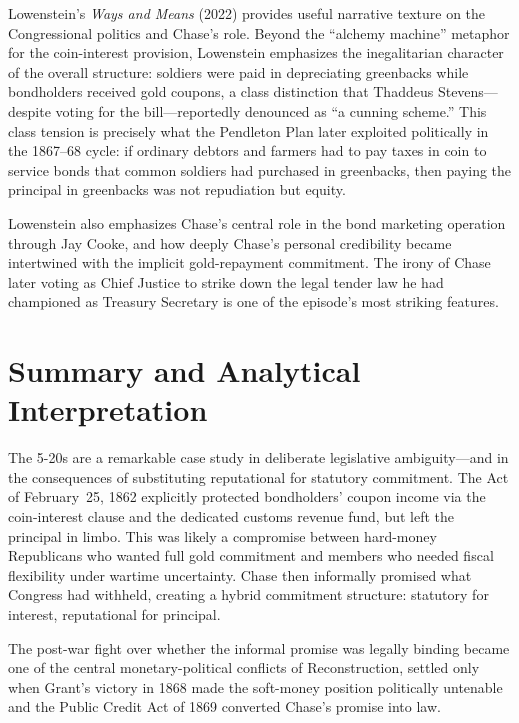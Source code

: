 \documentclass[12pt]{article}
\begin{document}
Lowenstein's \textit{Ways and Means} (2022) provides useful narrative
texture on the Congressional politics and Chase's role. Beyond the
``alchemy machine'' metaphor for the coin-interest provision, Lowenstein
emphasizes the inegalitarian character of the overall structure: soldiers
were paid in depreciating greenbacks while bondholders received gold
coupons, a class distinction that Thaddeus Stevens---despite voting for
the bill---reportedly denounced as ``a cunning scheme.'' This class
tension is precisely what the Pendleton Plan later exploited politically
in the 1867--68 cycle: if ordinary debtors and farmers had to pay taxes
in coin to service bonds that common soldiers had purchased in greenbacks,
then paying the principal in greenbacks was not repudiation but equity.

Lowenstein also emphasizes Chase's central role in the bond marketing
operation through Jay Cooke, and how deeply Chase's personal credibility
became intertwined with the implicit gold-repayment commitment. The
irony of Chase later voting as Chief Justice to strike down the legal
tender law he had championed as Treasury Secretary is one of the
episode's most striking features.

\section{Summary and Analytical Interpretation}

The 5-20s are a remarkable case study in deliberate legislative
ambiguity---and in the consequences of substituting reputational for
statutory commitment. The Act of February~25, 1862 explicitly protected
bondholders' coupon income via the coin-interest clause and the dedicated
customs revenue fund, but left the principal in limbo. This was likely a
compromise between hard-money Republicans who wanted full gold commitment
and members who needed fiscal flexibility under wartime uncertainty.
Chase then informally promised what Congress had withheld, creating a
hybrid commitment structure: statutory for interest, reputational for
principal.

The post-war fight over whether the informal promise was legally binding
became one of the central monetary-political conflicts of Reconstruction,
settled only when Grant's victory in 1868 made the soft-money position
politically untenable and the Public Credit Act of 1869 converted Chase's
promise into law.
\end{document}
